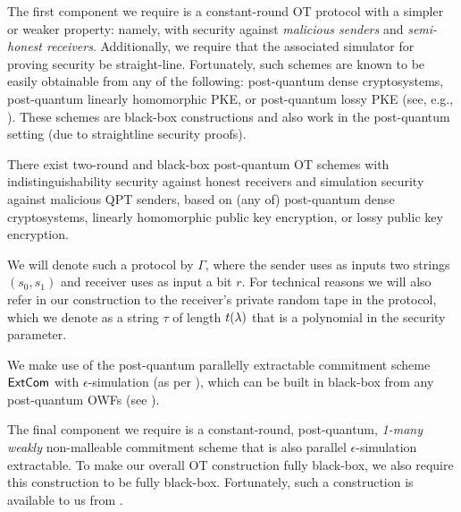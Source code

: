  The first component we require is a constant-round OT protocol with a simpler or weaker property: namely, with security against {\em malicious senders} and {\em semi-honest receivers}. Additionally, we require that the associated simulator for proving security be straight-line. Fortunately, such schemes are known to be easily obtainable from any of the following: 
 post-quantum dense cryptosystems, post-quantum linearly homomorphic PKE, or post-quantum lossy PKE (see, e.g., \cite{TCC:CDMW09,FOCS:Wee10}). These schemes are black-box constructions and also work in the post-quantum setting (due to straightline security proofs).  


\begin{theorem}
    There exist two-round and black-box post-quantum OT schemes with indistinguishability security against honest receivers and simulation security against malicious QPT senders, based on (any of) post-quantum 
    dense cryptosystems, linearly homomorphic public key encryption, or lossy public key encryption. 

\end{theorem}

We will denote such a protocol by $\Gamma$, where the sender uses as inputs two strings $(s_0,s_1)$ and receiver uses as input a bit $r$. For technical reasons we will also refer in our construction to the receiver's private random tape in the protocol, which we denote as a string $\tau$ of length $t(\lambda)$ that is a polynomial in the security parameter.

 We make use of the post-quantum parallelly extractable commitment scheme $\mathsf{ExtCom}$ with $\epsilon$-simulation (as per ), which can be built in black-box from any post-quantum OWFs (see ).


 The final component we require is a constant-round, post-quantum, {\em 1-many weakly} non-malleable commitment scheme that is also parallel $\epsilon$-simulation extractable. %
To make our overall OT construction fully black-box, we also require this construction to be fully black-box. Fortunately, such a construction is available to us from . 

